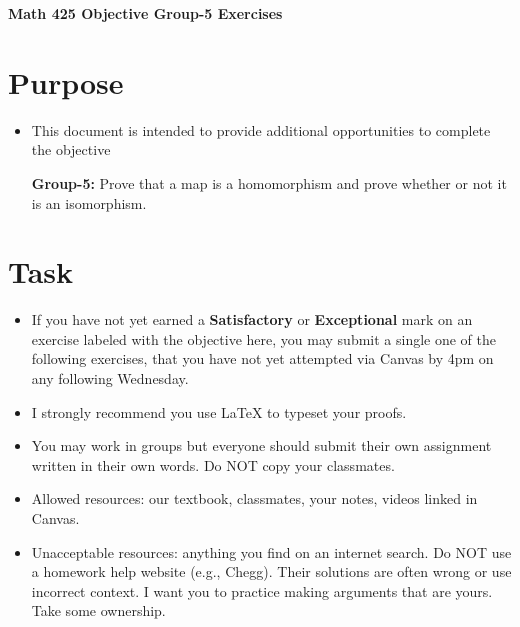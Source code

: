 \documentclass[12pt]{article}
\begin{document}
	\begin{center}
		{\Large \bf Math 425 Objective Group-5 Exercises}
	\end{center}
	\section*{Purpose}
	\begin{itemize}
		\item This document is intended to provide additional opportunities to complete the objective
		
		\textbf{Group-5:}  Prove that a map is a homomorphism and prove whether or not it is an isomorphism.
	\end{itemize}
	\section*{Task}
	\begin{itemize}
		\item If you have not yet earned a \textbf{Satisfactory} or \textbf{Exceptional} mark on an exercise labeled with the objective here, you may submit a single one of the following exercises, that you have not yet attempted via Canvas by 4pm on any following Wednesday.
		\item I strongly recommend you use LaTeX to typeset your proofs.
		\item You may work in groups but everyone should submit their own assignment written in their own words.  Do NOT copy your classmates.
		\item Allowed resources: our textbook, classmates, your notes, videos linked in Canvas.
		\item Unacceptable resources: anything you find on an internet search. Do NOT use a homework help website (e.g., Chegg). Their solutions are often wrong or use incorrect context.  I want you to practice making arguments that are yours. Take some ownership.
	\end{itemize}
\end{document}
